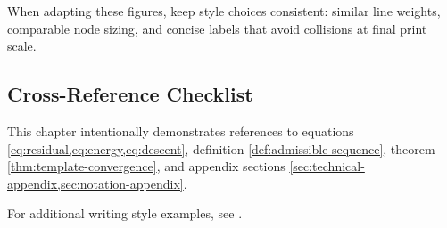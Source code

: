 When adapting these figures, keep style choices consistent: similar line weights, comparable node sizing, and concise labels that avoid collisions at final print scale.

\subsection{Cross-Reference Checklist}
\label{ssec:checklist}

This chapter intentionally demonstrates references to equations \cref{eq:residual,eq:energy,eq:descent}, definition \cref{def:admissible-sequence}, theorem \cref{thm:template-convergence}, and appendix sections \cref{sec:technical-appendix,sec:notation-appendix}.

For additional writing style examples, see \cite{tao2011book,knuth1984texbook}.
